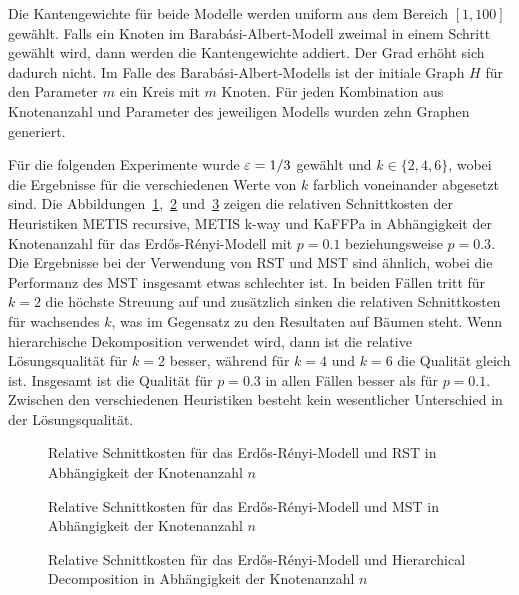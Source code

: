 Die Kantengewichte für beide Modelle werden uniform aus dem Bereich $[1, 100]$ gewählt.
Falls ein Knoten im Barabási-Albert-Modell zweimal in einem Schritt gewählt wird, dann werden die Kantengewichte addiert.
Der Grad erhöht sich dadurch nicht.
Im Falle des Barabási-Albert-Modells ist der initiale Graph $H$ für den Parameter $m$ ein Kreis mit $m$ Knoten.
Für jeden Kombination aus Knotenanzahl und Parameter des jeweiligen Modells wurden zehn Graphen generiert.

Für die folgenden Experimente wurde $\varepsilon=1/3$ gewählt und $k \in \{2, 4, 6\}$, wobei die Ergebnisse für die verschiedenen Werte von $k$ farblich voneinander abgesetzt sind.
Die Abbildungen~\ref{fig:edgeprobrstnode},~\ref{fig:edgeprobmstnode} und~\ref{fig:edgeprobhdecompnode} zeigen die relativen Schnittkosten der Heuristiken METIS recursive, METIS k-way und KaFFPa in Abhängigkeit der Knotenanzahl für das Erdős-Rényi-Modell mit $p=0.1$ beziehungsweise $p=0.3$.
Die Ergebnisse bei der Verwendung von RST und MST sind ähnlich, wobei die Performanz des MST insgesamt etwas schlechter ist.
In beiden Fällen tritt für $k=2$ die höchste Streuung auf und zusätzlich sinken die relativen Schnittkosten für wachsendes $k$, was im Gegensatz zu den Resultaten auf Bäumen steht.
Wenn hierarchische Dekomposition verwendet wird, dann ist die relative Lösungsqualität für $k=2$ besser, während für $k=4$ und $k=6$ die Qualität gleich ist.
Insgesamt ist die Qualität für $p=0.3$ in allen Fällen besser als für $p=0.1$.
Zwischen den verschiedenen Heuristiken besteht kein wesentlicher Unterschied in der Lösungsqualität.

\begin{figure}[H]
    \centering
    
    \caption{Relative Schnittkosten für das Erdős-Rényi-Modell und RST in Abhängigkeit der Knotenanzahl $n$\label{fig:edgeprobrstnode}}
\end{figure}

\begin{figure}[H]
    \centering
    
    \caption{Relative Schnittkosten für das Erdős-Rényi-Modell und MST in Abhängigkeit der Knotenanzahl $n$\label{fig:edgeprobmstnode}}
\end{figure}

\begin{figure}[H]
    \centering
    
    \caption{Relative Schnittkosten für das Erdős-Rényi-Modell und Hierarchical Decomposition in Abhängigkeit der Knotenanzahl $n$\label{fig:edgeprobhdecompnode}}
\end{figure}


